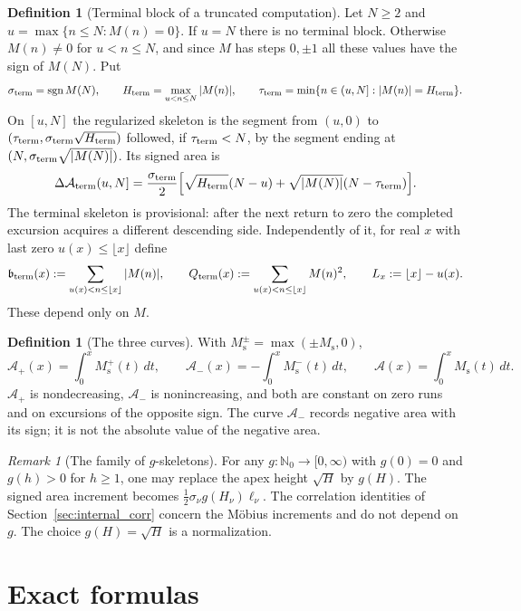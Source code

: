 \documentclass[11pt]{amsart}
\numberwithin{equation}{section}
\theoremstyle{plain}
\theoremstyle{definition}
\newtheorem{definition}[theorem]{Definition}
\theoremstyle{remark}
\newtheorem{remark}[theorem]{Remark}
\DeclareMathOperator{\sgn}{sgn}
\newcommand{\Ms}{M_{\mathrm{s}}}
\newcommand{\Ap}{\mathcal{A}_{+}}
\newcommand{\Am}{\mathcal{A}_{-}}
\newcommand{\Anet}{\mathcal{A}}
\begin{document}
\begin{definition}[Terminal block of a truncated computation]
\label{def:Ms-terminal}
Let $N\ge2$ and $u=\max\{n\le N:M(n)=0\}$. If $u=N$ there is no terminal
block. Otherwise $M(n)\ne0$ for $u<n\le N$, and since $M$ has steps
$0,\pm1$ all these values have the sign of $M(N)$. Put
\[
\sigma_{\rm term}=\sgn M(N),\qquad
H_{\rm term}=\max_{u<n\le N}|M(n)|,\qquad
\tau_{\rm term}=\min\{n\in(u,N]:|M(n)|=H_{\rm term}\}.
\]
On $[u,N]$ the regularized skeleton is the segment from $(u,0)$ to
$(\tau_{\rm term},\sigma_{\rm term}\sqrt{H_{\rm term}})$ followed, if
$\tau_{\rm term}<N$, by the segment ending at
$(N,\sigma_{\rm term}\sqrt{|M(N)|})$. Its signed area is
\[
\Delta\Anet_{\rm term}(u,N]=\frac{\sigma_{\rm term}}2
\Bigl[\sqrt{H_{\rm term}}(N-u)+
\sqrt{|M(N)|}(N-\tau_{\rm term})\Bigr].
\]
The terminal skeleton is provisional: after the next return to zero the
completed excursion acquires a different descending side. Independently of
it, for real $x$ with last zero $u(x)\le\lfloor x\rfloor$ define
\[
\mathfrak b_{\rm term}(x):=\sum_{u(x)<n\le\lfloor x\rfloor}|M(n)|,\qquad
Q_{\rm term}(x):=\sum_{u(x)<n\le\lfloor x\rfloor}M(n)^2,\qquad
L_x:=\lfloor x\rfloor-u(x).
\]
These depend only on $M$.
\end{definition}

\begin{definition}[The three curves]
\label{def:areas}
With $\Ms^{\pm}=\max(\pm\Ms,0)$,
\begin{equation}
\label{eq:areas_def}
\Ap(x)=\int_0^x\Ms^+(t)\,dt,\qquad
\Am(x)=-\int_0^x\Ms^-(t)\,dt,\qquad
\Anet(x)=\int_0^x\Ms(t)\,dt.
\end{equation}
$\Ap$ is nondecreasing, $\Am$ is nonincreasing, and both are constant on
zero runs and on excursions of the opposite sign.  The curve $\Am$ records
negative area with its sign; it is not the absolute value of the negative
area.
\end{definition}

\begin{remark}[The family of $g$-skeletons]
\label{rem:g-skeleton}
For any $g:\mathbb N_0\to[0,\infty)$ with $g(0)=0$ and $g(h)>0$ for $h\ge1$,
one may replace the apex height $\sqrt H$ by $g(H)$. The signed area
increment becomes $\tfrac12\sigma_\nu g(H_\nu)\ell_\nu$. The correlation
identities of Section~\ref{sec:internal_corr} concern the M\"obius
increments and do not depend on $g$. The choice $g(H)=\sqrt H$ is a
normalization.
\end{remark}


\section{Exact formulas}
\label{sec:formulas}
\end{document}
